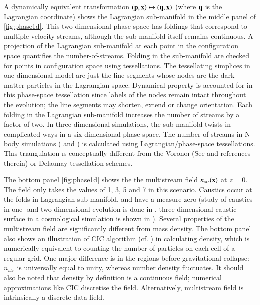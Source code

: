  
A dynamically equivalent transformation $(\bf{p}, \bf{x}) \mapsto (\bf{q}, \bf{x}) $ (where $\bf{q}$ is the Lagrangian coordinate) shows the Lagrangian sub-manifold in the middle panel of \autoref{fig:phase1d}. This two-dimensional phase-space has foldings that correspond to multiple velocity streams, although the sub-manifold itself remains continuous. A projection of the Lagrangian sub-manifold at each point in the configuration space quantifies the number-of-streams. Folding in the sub-manifold are checked for points in configuration space using tessellations. The tessellating simplices in one-dimensional model are just the line-segments whose nodes are the dark matter particles in the Lagrangian space. Dynamical property is accounted for in this phase-space tessellation since labels of the nodes remain intact throughout the evolution; the line segments may shorten, extend or change orientation. Each folding in the Lagrangian sub-manifold increases the number of streams by a factor of two. In three-dimensional simulations, the sub-manifold twists in complicated ways in a six-dimensional phase space. The number-of-streams in N-body simulations (\citealt{Shandarin2012} and \citealt{Abel2012}) is calculated using Lagrangian/phase-space tessellations. This triangulation is conceptually different from the Voronoi (See \citealt{Schaap2000} and references therein) or Delaunay \citep{Icke1991} tessellation schemes. 

The bottom panel \autoref{fig:phase1d} shows the the multistream field $n_{str}(\bf{x})$ at $z = 0$. The field only takes the values of 1, 3, 5 and 7 in this scenario. Caustics occur at the folds in Lagrangian sub-manifold, and have a measure zero (study of caustics in one- and  two-dimensional evolution is done in \cite{Hidding2014}, three-dimensional caustic surface in a cosmological simulation is shown in \cite{Ramachandra2017} ). Several properties of the multistream field are significantly different from mass density. The bottom panel also shows an illustration of CIC algorithm (cf. \citealt{Hockney1988}) in calculating density, which is numerically equivalent to counting the number of particles on each cell of a regular grid. One major difference is in the regions before gravitational collapse: $n_{str}$ is universally equal to unity, whereas number density fluctuates. It should also be noted that density by definition is a continuous field; numerical approximations like CIC discretise the field. Alternatively, multistream field is intrinsically a discrete-data field.  



